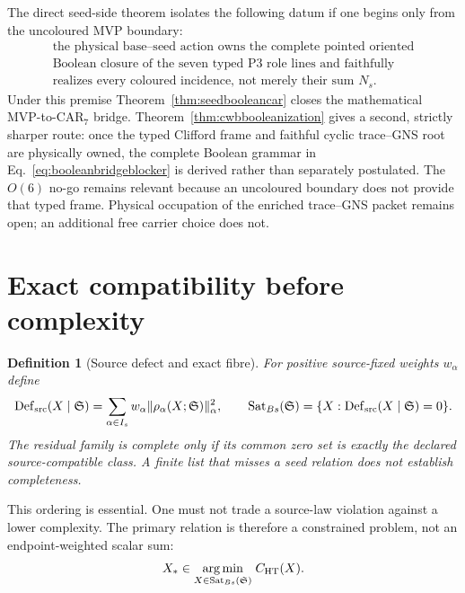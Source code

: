 \documentclass[11pt,a4paper]{article}
\newtheorem{definition}{Definition}[section]
\theoremstyle{remark}
\newcommand{\Defsrc}{\operatorname{Def}_{\rm src}}
\newcommand{\Sat}{\operatorname{Sat}_{Bs}}
\begin{document}
The direct seed-side theorem isolates the following datum if one begins only
from the uncoloured MVP boundary:
\begin{equation}
 \boxed{\begin{gathered}
 \text{the physical base--seed action owns the complete pointed oriented}\\
 \text{Boolean closure of the seven typed P3 role lines and faithfully}\\
 \text{realizes every coloured incidence, not merely their sum }N_s.
 \end{gathered}}
 \label{eq:booleanbridgeblocker}
\end{equation}
Under this premise Theorem~\ref{thm:seedbooleancar} closes the mathematical
MVP-to-CAR$_7$ bridge.  Theorem~\ref{thm:cwbbooleanization} gives a second,
strictly sharper route: once the typed Clifford frame and faithful cyclic
trace--GNS root are physically owned, the complete Boolean grammar in
Eq.~\eqref{eq:booleanbridgeblocker} is derived rather than separately
postulated.  The $O(6)$ no-go remains relevant because an uncoloured boundary
does not provide that typed frame.  Physical occupation of the enriched
trace--GNS packet remains open; an additional free carrier choice does not.

\section{Exact compatibility before complexity}

\begin{definition}[Source defect and exact fibre]
For positive source-fixed weights $w_\alpha$ define
\begin{equation}
 \Defsrc(X\mid\mathfrak S)
 =\sum_{\alpha\in I_s}w_\alpha
   \|\rho_\alpha(X;\mathfrak S)\|_\alpha^2,
 \qquad
 \Sat(\mathfrak S)=\{X:\Defsrc(X\mid\mathfrak S)=0\}.
 \label{eq:defect}
\end{equation}
The residual family is complete only if its common zero set is exactly the
declared source-compatible class.  A finite list that misses a seed relation
does not establish completeness.
\end{definition}

This ordering is essential.  One must not trade a source-law violation against
a lower complexity.  The primary relation is therefore a constrained problem,
not an endpoint-weighted scalar sum:
\begin{equation}
 X_*\in\underset{X\in\Sat(\mathfrak S)}{\arg\min}\;C_{\rm HT}(X).
 \label{eq:selector}
\end{equation}
\end{document}
